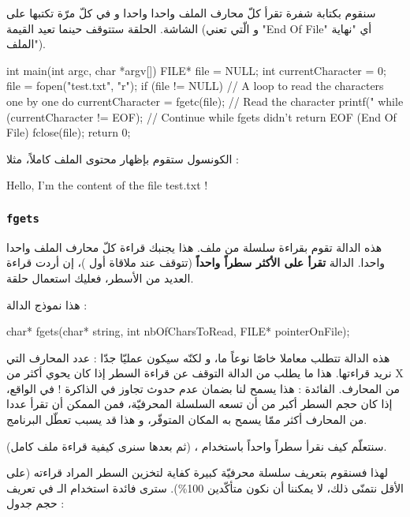 سنقوم بكتابة شفرة تقرأ كلّ محارف الملف واحدا واحدا و في كلّ مرّة تكتبها على الشاشة. الحلقة ستتوقف حينما تعيد
القيمة
(و الّتي تعني
"\textenglish{End Of File}"
أي "نهاية الملف").

\begin{Csource}
int main(int argc, char *argv[])
{
	FILE* file = NULL;
	int currentCharacter = 0;
	file = fopen("test.txt", "r");
	if (file != NULL)
	{
  		// A loop to read the characters one by one
  		do
  		{
    			currentCharacter = fgetc(file); // Read the character
    			printf("%
  		} while (currentCharacter != EOF); // Continue while fgets didn't return EOF (End Of File)
  		fclose(file);
	}
	return 0;
}
\end{Csource}
الكونسول ستقوم بإظهار محتوى الملف كاملاً، مثلا :
\begin{Console}
Hello, I'm the content of the file test.txt !
\end{Console}

\subsubsection{\texttt{fgets}}
هذه الدالة تقوم بقراءة سلسلة من ملف. هذا يجنبك قراءة كلّ محارف الملف واحدا واحدا. الدالة
\textbf{تقرأ على الأكثر سطراً واحداً}
(تتوقف عند ملاقاة أول
)،
إن أردت قراءة العديد من الأسطر، فعليك استعمال حلقة.

هذا نموذج الدالة :

\begin{Csource}
char* fgets(char* string, int nbOfCharsToRead, FILE* pointerOnFile);
\end{Csource}

هذه الدالة تتطلب معاملا خاصّا نوعاً ما، و لكنّه سيكون عمليّا جدّا : عدد المحارف التي نريد قراءتها. هذا ما يطلب من الدالة
التوقف عن قراءة السطر إذا كان يحوي أكثر من
\textenglish{X}
من المحارف.
الفائدة : هذا يسمح لنا بضمان عدم حدوث تجاوز في الذاكرة ! في الواقع، إذا كان حجم السطر أكبر من أن تسعه السلسلة المحرفيّة، فمن الممكن أن تقرأ عددا من المحارف أكثر ممّا يسمح به المكان المتوفّر، و هذا قد يسبب تعطّل البرنامج.

سنتعلّم كيف نقرأ سطراً واحداً باستخدام
،
(ثم  بعدها سنرى كيفية قراءة ملف كامل).

لهذا فسنقوم بتعريف سلسلة محرفيّة كبيرة كفاية لتخزين السطر المراد قراءته (على الأقل نتمنّى ذلك، لا يمكننا أن نكون متأكّدين
100\%).
سترى فائدة استخدام الـ
في تعريف حجم جدول :

